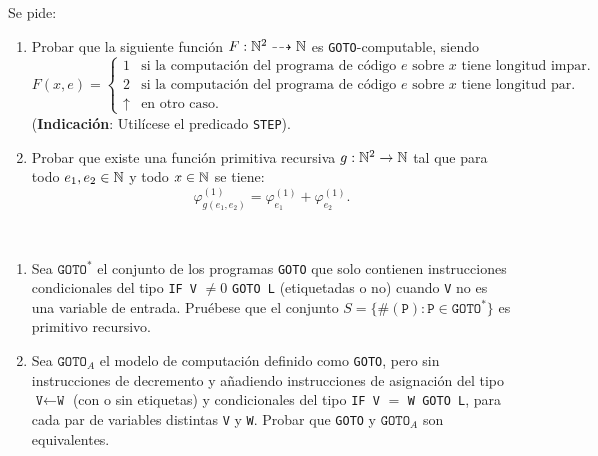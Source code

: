 \documentclass[twoside]{article}
\begin{document}
\begin{ejercicio}{2}
Se pide:
\begin{enumerate}
\item Probar que la siguiente función $F : \mathbb{N}^2\dashrightarrow \mathbb{N}$ es \texttt{GOTO}-computable, siendo
\[
F(x,e)=\begin{cases}
1 & \text{si la computación del programa de código }e\text{ sobre }x\text{ tiene longitud impar}.\\
2 & \text{si la computación del programa de código }e\text{ sobre }x\text{ tiene longitud par}.\\
\uparrow & \text{en otro caso}.
\end{cases}
\]
(\textbf{Indicación}: Utilícese el predicado \texttt{STEP}).
\item Probar que existe una función primitiva recursiva $g : \mathbb{N}^2 \to \mathbb{N}$ tal que para todo
$e_1, e_2 \in \mathbb{N}$ y todo $x \in \mathbb{N}$ se tiene:
$$\varphi_{g(e_1,e_2)}^{(1)}=\varphi_{e_1}^{(1)}+\varphi_{e_2}^{(1)}.$$
\end{enumerate}
\end{ejercicio}
\begin{solucion}
\end{solucion}

\newpage

\begin{ejercicio}{3}
\end{ejercicio}\
\begin{enumerate}
\item Sea $\texttt{GOTO}^*$ el conjunto de los programas \texttt{GOTO} que solo contienen instrucciones condicionales
del tipo \texttt{IF V} $\neq 0$ \texttt{GOTO L} (etiquetadas o no) cuando \texttt{V} no es una variable de
entrada. Pruébese que el conjunto $S = \{\#(\texttt{P}) : \texttt{P} \in \texttt{GOTO}^*\}$ es primitivo recursivo.

\item Sea $\texttt{GOTO}_A$ el modelo de computación definido como \texttt{GOTO}, pero sin instrucciones de
decremento y añadiendo instrucciones de asignación del tipo $\texttt{V}\leftarrow \texttt{W}$ (con o sin etiquetas)
y condicionales del tipo \texttt{IF V} $=$ \texttt{W GOTO L}, para cada par de variables distintas \texttt{V} y \texttt{W}.
Probar que \texttt{GOTO} y $\texttt{GOTO}_A$ son equivalentes.
\end{enumerate}
\begin{solucion}
\end{solucion}

\newpage
\end{document}
